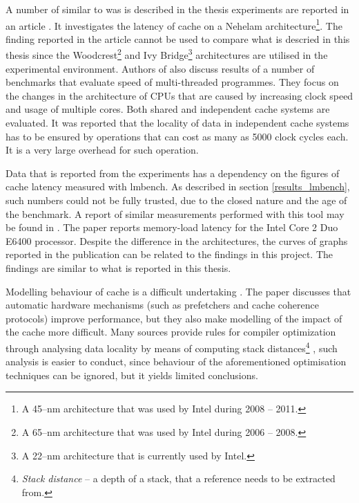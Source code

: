 A number of similar to was is described in the thesis experiments are reported in an article \cite{Molka2009a}. It investigates the latency of cache on a Nehelam architecture\footnote{A 45--nm architecture that was used by Intel during 2008 -- 2011.}. The finding reported in the article cannot be used to compare what is descried in this thesis since the Woodcrest\footnote{A 65--nm architecture that was used by Intel during 2006 -- 2008.} and Ivy Bridge\footnote{A 22--nm architecture that is currently used by Intel.} architectures are utilised in the experimental environment. Authors of \cite{KentMilfeldKazushigeGotoAviPurkayastha2007} also discuss results of a number of benchmarks that evaluate speed of multi-threaded programmes. They focus on the changes in the architecture of CPUs that are caused by increasing clock speed and usage of multiple cores. Both shared and independent cache systems are evaluated. It was reported that the locality of data in independent cache systems has to be ensured by operations that can cost as many as 5000 clock cycles each. It is a very large overhead for such operation.

Data that is reported from the experiments has a dependency on the figures of cache latency measured with lmbench. As described in section \ref{results_lmbench}, such numbers could not be fully trusted, due to the closed nature and the age of the benchmark. A report of similar measurements performed with this tool may be found in \cite{Prakash2007}. The paper reports memory-load latency for the Intel Core 2 Duo E6400 processor. Despite the difference in the architectures, the curves of graphs reported in the publication can be related to the findings in this project. The findings are similar to what is reported in this thesis.

Modelling behaviour of cache is a difficult undertaking \cite{Shen2000,Putigny2014}. The paper \cite{Putigny2014} discusses that automatic hardware mechanisms (such as prefetchers and cache coherence protocols) improve performance, but they also make modelling of the impact of the cache more difficult. Many sources provide rules for compiler optimization through analysing data locality by means of computing stack distances\footnote{\textit{Stack distance} -- a depth of a stack, that a reference needs to be extracted from.} \cite{Vera2004,Cacaval2003}, such analysis is easier to conduct, since behaviour of the aforementioned optimisation techniques can be ignored, but it yields limited conclusions.

